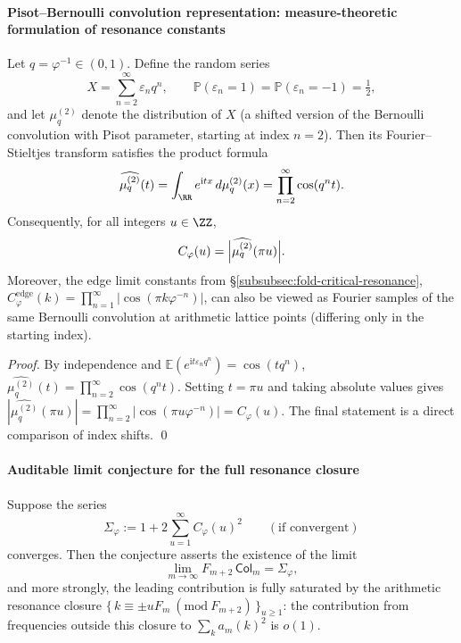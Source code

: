 \paragraph{Pisot--Bernoulli convolution representation: measure-theoretic formulation of resonance constants}
\begin{theorem}\label{thm:fold-pisot-bernoulli-convolution-representation}
Let \(q=\varphi^{-1}\in(0,1)\).
Define the random series
\[
X=\sum_{n=2}^{\infty}\varepsilon_n q^n,
\qquad
\mathbb{P}(\varepsilon_n=1)=\mathbb{P}(\varepsilon_n=-1)=\tfrac12,
\]
and let \(\mu_q^{(2)}\) denote the distribution of \(X\) (a shifted version of the Bernoulli convolution with Pisot parameter, starting at index \(n=2\)).
Then its Fourier--Stieltjes transform satisfies the product formula
\[
\widehat{\mu_q^{(2)}}(t)
=\int_{\RR}e^{\mathrm{i}tx}\,d\mu_q^{(2)}(x)
=\prod_{n=2}^{\infty}\cos(q^n t).
\]
Consequently, for all integers \(u\in\ZZ\),
\[
C_\varphi(u)=\Bigl|\widehat{\mu_q^{(2)}}(\pi u)\Bigr|.
\]
Moreover, the edge limit constants from \S\ref{subsubsec:fold-critical-resonance},
\(
C_\varphi^{\mathrm{edge}}(k)=\prod_{n=1}^{\infty}|\cos(\pi k\varphi^{-n})|
\),
can also be viewed as Fourier samples of the same Bernoulli convolution at arithmetic lattice points (differing only in the starting index).
\end{theorem}

\begin{proof}
By independence and \(\mathbb{E}(e^{\mathrm{i}t\varepsilon_n q^n})=\cos(tq^n)\),
\(
\widehat{\mu_q^{(2)}}(t)=\prod_{n=2}^{\infty}\cos(q^n t)
\).
Setting \(t=\pi u\) and taking absolute values gives
\(
|\widehat{\mu_q^{(2)}}(\pi u)|=\prod_{n=2}^{\infty}|\cos(\pi u\varphi^{-n})|=C_\varphi(u)
\).
The final statement is a direct comparison of index shifts. \qed
\end{proof}

\paragraph{Auditable limit conjecture for the full resonance closure}
\begin{conjecture}\label{conj:fold-collision-constant-full-resonance-closure}
Suppose the series
\[
\Sigma_\varphi:=1+2\sum_{u=1}^{\infty}C_\varphi(u)^2
\qquad(\text{if convergent})
\]
converges.
Then the conjecture asserts the existence of the limit
\[
\lim_{m\to\infty}F_{m+2}\,\mathsf{Col}_m=\Sigma_\varphi,
\]
and more strongly, the leading contribution is fully saturated by the arithmetic resonance closure \(\{\,k\equiv \pm uF_m\ (\mathrm{mod}\ F_{m+2})\,\}_{u\ge 1}\):
the contribution from frequencies outside this closure to \(\sum_k a_m(k)^2\) is \(o(1)\).
\end{conjecture}

